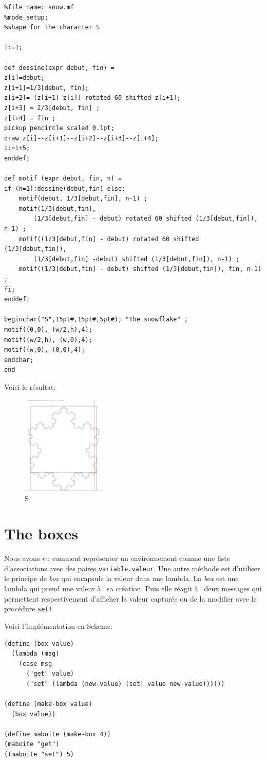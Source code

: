\documentclass[11pt]{book}
\newcommand{\snow}{{\lettersnow S\hspace{0.2cm}}}
\begin{document}
\begin{Verbatim}
%file name: snow.mf
%mode_setup;
%shape for the character S

i:=1;

def dessine(expr debut, fin) =
z[i]=debut;
z[i+1]=1/3[debut, fin];
z[i+2]= (z[i+1]-z[i]) rotated 60 shifted z[i+1];
z[i+3] = 2/3[debut, fin] ;
z[i+4] = fin ;  
pickup pencircle scaled 0.1pt;
draw z[i]--z[i+1]--z[i+2]--z[i+3]--z[i+4];
i:=i+5;
enddef;

def motif (expr debut, fin, n) =
if (n=1):dessine(debut,fin) else: 
	motif(debut, 1/3[debut,fin], n-1) ;
	motif(1/3[debut,fin],
		(1/3[debut,fin] - debut) rotated 60 shifted (1/3[debut,fin]), n-1) ;
	motif((1/3[debut,fin] - debut) rotated 60 shifted (1/3[debut,fin]),
		(1/3[debut,fin] -debut) shifted (1/3[debut,fin]), n-1) ;
	motif((1/3[debut,fin] - debut) shifted (1/3[debut,fin]), fin, n-1) ;
fi;
enddef;

beginchar("S",15pt#,15pt#,5pt#); "The snowflake" ;
motif((0,0), (w/2,h),4);
motif((w/2,h), (w,0),4);
motif((w,0), (0,0),4);
endchar;
end
\end{Verbatim}

Voici le résultat:
\begin{figure}[H]
	\centering
	\caption{\snow}
	\includegraphics[width=4.0cm]{snow.png}
\end{figure}

\section{The boxes}
Nous avons vu comment représenter un environnement comme une liste
d'associations avec des paires \verb+variable.valeur+.
Une autre méthode est d'utiliser le principe de \textit{box} qui encapsule la
valeur dans une lambda. La \textit{box} est une lambda qui prend une valeur à  sa
création. Puis elle réagit à  deux messages qui permettent respectivement
d'afficher la valeur capturée ou de la modifier avec la procédure \verb+set!+


Voici l'implémentation en Scheme:
\begin{Verbatim}
(define (box value)
  (lambda (msg)
    (case msg
      ("get" value)
      ("set" (lambda (new-value) (set! value new-value))))))

(define (make-box value)
  (box value))

(define maboite (make-box 4))
(maboite "get")
((maboite "set") 5)
\end{Verbatim}
\end{document}
